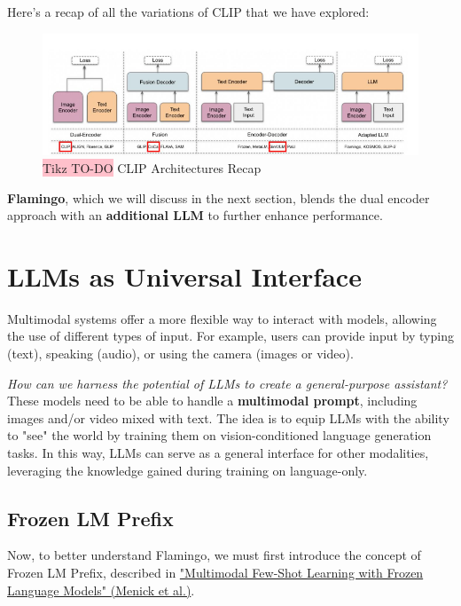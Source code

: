 Here's a recap of all the variations of CLIP that we have explored:

\begin{figure}[!htbp]
    \centering
    \includegraphics[width=\linewidth]{tikz/chapter11 - CLIP Architectures Recap.png}
    \caption{{\color{red}\colorbox{pink}{Tikz TO-DO}} CLIP Architectures Recap}
\end{figure}

\textbf{Flamingo}, which we will discuss in the next section, blends the dual encoder approach with an \textbf{additional LLM} to further enhance performance.

\section{LLMs as Universal Interface}

Multimodal systems offer a more flexible way to interact with models, allowing the use of different types of input. For example, users can provide input by typing (text), speaking (audio), or using the camera (images or video).

\textit{How can we harness the potential of LLMs to create a general-purpose assistant?} These models need to be able to handle a \textbf{multimodal prompt}, including images and/or video mixed with text. The idea is to equip LLMs with the ability to "see" the world by training them on vision-conditioned language generation tasks. In this way, LLMs can serve as a general interface for other modalities, leveraging the knowledge gained during training on language-only.

\subsection{Frozen LM Prefix}

Now, to better understand Flamingo, we must first introduce the concept of Frozen LM Prefix, described in \href{https://arxiv.org/pdf/2106.13884}{"Multimodal Few-Shot Learning with Frozen Language Models" (Menick et al.)}. 

